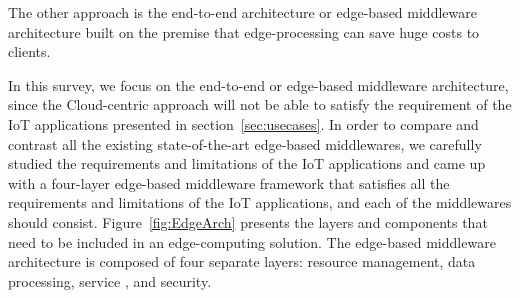 The other approach is the end-to-end architecture or edge-based middleware architecture built on the premise that edge-processing can save huge costs to clients. %

In this survey, we focus on the end-to-end or edge-based middleware architecture, since the Cloud-centric approach will not be able to satisfy the requirement of the IoT applications presented in section~\ref{sec:usecases}. In order to compare and contrast all the existing state-of-the-art edge-based middlewares, we carefully studied the requirements and limitations of the IoT applications and came up with a four-layer edge-based middleware framework that satisfies all the requirements and limitations of the IoT applications, and each of the middlewares should consist. Figure~\ref{fig:EdgeArch} presents the layers and components that need to be included in an edge-computing solution. The edge-based middleware architecture is composed of four separate layers: resource management, data processing, service , and security.

